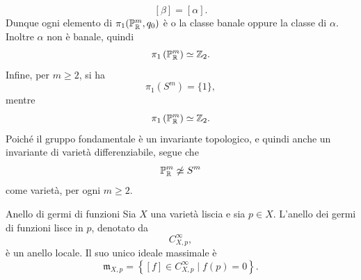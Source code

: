 \documentclass[a4paper]{article}
\begin{document}
\begin{snippetproof}{}
    \[
        [\beta]=[\alpha].
    \]
    Dunque ogni elemento di \(\pi_1(\mathbb{P}^m_{\mathbb{R}},q_0)\) è o la classe banale oppure la classe di \(\alpha\). Inoltre \(\alpha\) non è banale, quindi
    \[
        \pi_1\left(\mathbb{P}^m_{\mathbb{R}}\right)\simeq\mathbb{Z}_2.
    \]
    Infine, per \(m\geq2\), si ha
    \[
        \pi_1(S^m)=\{1\},
    \]
    mentre
    \[
        \pi_1\left(\mathbb{P}^m_{\mathbb{R}}\right)\simeq\mathbb{Z}_2.
    \]
    Poiché il gruppo fondamentale è un invariante topologico, e quindi anche un invariante di varietà differenziabile, segue che
    \[
        \mathbb{P}^m_{\mathbb{R}}\not\simeq S^m
    \]
    come varietà, per ogni \(m\geq2\).
\end{snippetproof}



\begin{snippetproposition}{Anello di germi di funzioni}
    Sia \(X\) una varietà liscia e sia \(p\in X\). L'anello dei germi di funzioni lisce
    in \(p\), denotato da
    \[
        C^\infty_{X,p},
    \]
    è un anello locale. Il suo unico ideale massimale è
    \[
        \mathfrak{m}_{X,p}
        =
        \left\{[f]\in C^\infty_{X,p}\mid f(p)=0\right\}.
    \]
\end{snippetproposition}
\end{document}
